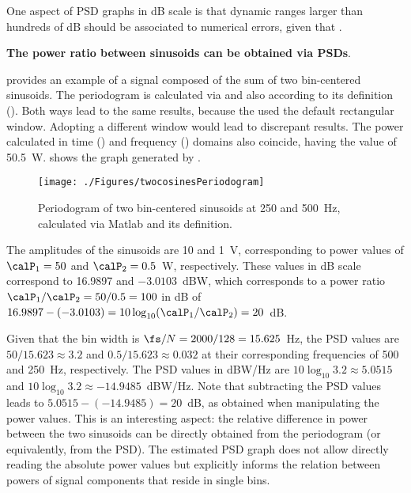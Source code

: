 One aspect of PSD graphs in dB scale is that dynamic ranges larger than hundreds of dB should be associated to numerical errors, given that .
\eExample

\bExample \textbf{The power ratio between sinusoids can be obtained via PSDs}.

 provides an example of a signal composed of the sum of two bin-centered sinusoids.
The periodogram is calculated via {\matlab} and also according to its definition (). Both ways lead to the same results, because the  used the default rectangular window.
Adopting a different window would lead to discrepant results. The power calculated in time () and frequency () domains also coincide, having the value of 50.5~W.
 shows the graph generated by .


\begin{figure}[htbp]
\centering
\texttt{[image: ./Figures/twocosinesPeriodogram]}
\caption{Periodogram of two bin-centered sinusoids at 250 and 500~Hz, calculated via Matlab and its definition.\label{fig:twocosinesPeriodogram}}
\end{figure}

The amplitudes of the sinusoids are 10 and 1~V, corresponding to power values of $\calP_1=50$ and $\calP_2=0.5$~W, respectively. These values in dB scale correspond to 16.9897 and $-3.0103$~dBW, which corresponds to a power ratio $\calP_1/\calP_2=50/0.5=100$ in dB of $16.9897-(-3.0103) = 10 \log_{10}(\calP_1/\calP_2)=20$~dB.

Given that the bin width is
$\fs/N = 2000/128=15.625$~Hz, the PSD values are $50/15.623 \approx 3.2$ and $0.5/15.623 \approx 0.032$ at their corresponding frequencies of 500 and 250~Hz, respectively. 
The PSD values in dBW/Hz are $10 \log_{10} 3.2 \approx 5.0515$ and $10 \log_{10} 3.2 \approx -14.9485$~dBW/Hz. Note that
subtracting the PSD values leads to $5.0515 - (-14.9485)=20$~dB, as obtained when manipulating the power values.
This is an interesting aspect: the relative difference in power between the two sinusoids can be directly obtained from
the periodogram (or equivalently, from the PSD). The estimated PSD graph does not allow directly reading the absolute power values but explicitly informs the relation between powers of signal components that reside in single bins.

